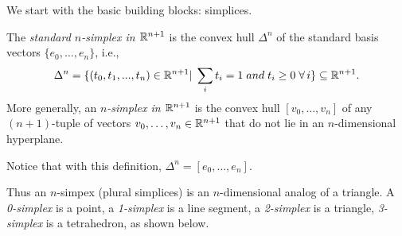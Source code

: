 \documentclass[11pt,a4paper]{report}
\begin{document}
	       We start with the basic building blocks: simplices.	
		   	
            \begin{defn}	
			    \label {n-simplex} The \emph{standard $n$-simplex in $\mathbb{R}^{n+1}$} is the convex hull $\Delta^n$ of the standard basis vectors	
			    $\{e_0,\ldots, e_n\}$, i.e.,	
			    \[	
			     \Delta^n = \{(t_0, t_1, ... , t_n) \in \mathbb{R}^{n+1} 	
			     | \; \sum\limits_i t_i = 1 \; and \; t_i \geq 0 \; \forall \, i \}\subseteq \mathbb{R}^{n+1}.	
			    \]	
			    More generally, an \emph{$n$-simplex in $\mathbb{R}^{n+1}$} is the convex hull $[v_0,\ldots,v_n]$ of any $(n+1)$-tuple of	
			    vectors $v_0,\ldots,v_n\in \mathbb{R}^{n+1}$ that do not lie in an $n$-dimensional hyperplane.	
		      \end{defn}	
		      	
		      Notice that with this definition, $\Delta^n=[e_0,\ldots,e_n]$.	
		      	
		      	
		      Thus an $n$-simpex (plural simplices) is an $n$-dimensional analog of a triangle.	
		       A  \emph{0-simplex} is a point, a \emph{1-simplex} is a line segment, a \emph{2-simplex} is a triangle, \emph{3-simplex} is a tetrahedron, as shown below. \\	
		      	
\end{document}
